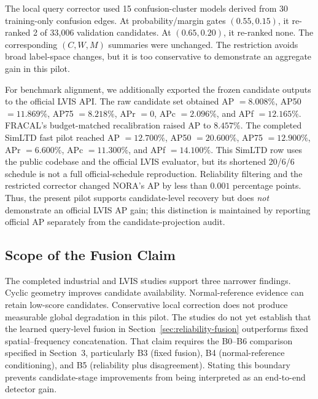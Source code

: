 The local query corrector used 15 confusion-cluster models derived from 30 training-only confusion edges. At probability/margin gates $(0.55,0.15)$, it re-ranked 2 of 33,006 validation candidates. At $(0.65,0.20)$, it re-ranked none. The corresponding $(C,W,M)$ summaries were unchanged. The restriction avoids broad label-space changes, but it is too conservative to demonstrate an aggregate gain in this pilot.

For benchmark alignment, we additionally exported the frozen candidate outputs to the official LVIS API. The raw candidate set obtained AP $=8.008\%$, AP50 $=11.869\%$, AP75 $=8.218\%$, APr $=0$, APc $=2.096\%$, and APf $=12.165\%$. FRACAL's budget-matched recalibration raised AP to $8.457\%$. The completed SimLTD fast pilot reached AP $=12.700\%$, AP50 $=20.600\%$, AP75 $=12.900\%$, APr $=6.600\%$, APc $=11.300\%$, and APf $=14.100\%$. This SimLTD row uses the public codebase and the official LVIS evaluator, but its shortened 20/6/6 schedule is not a full official-schedule reproduction. Reliability filtering and the restricted corrector changed NORA's AP by less than $0.001$ percentage points. Thus, the present pilot supports candidate-level recovery but does \emph{not} demonstrate an official LVIS AP gain; this distinction is maintained by reporting official AP separately from the candidate-projection audit.

\subsection{Scope of the Fusion Claim}

The completed industrial and LVIS studies support three narrower findings. Cyclic geometry improves candidate availability. Normal-reference evidence can retain low-score candidates. Conservative local correction does not produce measurable global degradation in this pilot. The studies do not yet establish that the learned query-level fusion in Section~\ref{sec:reliability-fusion} outperforms fixed spatial--frequency concatenation. That claim requires the B0--B6 comparison specified in Section~3, particularly B3 (fixed fusion), B4 (normal-reference conditioning), and B5 (reliability plus disagreement). Stating this boundary prevents candidate-stage improvements from being interpreted as an end-to-end detector gain.
